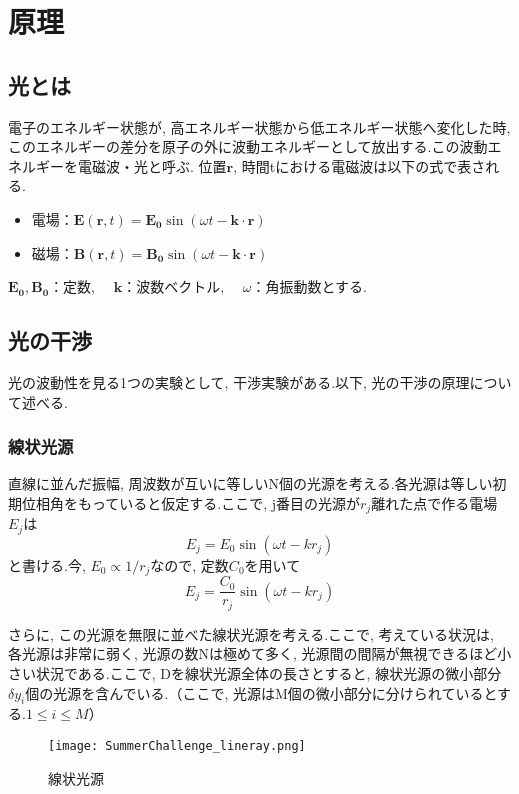 \section{原理}

\subsection{光とは}
電子のエネルギー状態が, 高エネルギー状態から低エネルギー状態へ変化した時, このエネルギーの差分を原子の外に波動エネルギーとして放出する.この波動エネルギーを電磁波・光と呼ぶ.
位置$\bm{r}$, 時間tにおける電磁波は以下の式で表される.
\begin{itemize}
  \item 電場：$\bm{E} (\bm{r}, t) = \bm{E_0} \sin (\omega t - \bm{k} \cdot \bm{r} ) $
  \item 磁場：$\bm{B} (\bm{r}, t) = \bm{B_0} \sin (\omega t - \bm{k} \cdot \bm{r} ) $
\end{itemize}
$\bm{E_0}, \bm{B_0}$：定数, 　$\bm{k}$：波数ベクトル, 　$\omega$：角振動数とする.

\subsection{光の干渉}
光の波動性を見る1つの実験として, 干渉実験がある.以下, 光の干渉の原理について述べる.
\subsubsection{線状光源}
直線に並んだ振幅, 周波数が互いに等しいN個の光源を考える.各光源は等しい初期位相角をもっていると仮定する.ここで, j番目の光源が$r_j$離れた点で作る電場$E_j$は
\[
  E_j = E_0 \sin(\omega t - k r_j)
\]
と書ける.今, $E_0 \varpropto 1/{r_j}$なので, 定数$C_0$を用いて
\[
  E_j = \frac{C_0}{r_j} \sin(\omega t - k r_j)
\]



さらに, この光源を無限に並べた線状光源を考える.ここで, 考えている状況は, 各光源は非常に弱く, 光源の数Nは極めて多く, 光源間の間隔が無視できるほど小さい状況である.ここで, Dを線状光源全体の長さとすると, 線状光源の微小部分$\delta y_i$個の光源を含んでいる.（ここで, 光源はM個の微小部分に分けられているとする.$1 \leq i \leq M$）
\\
\begin{figure}[b]
  \begin{center}
    \texttt{[image: SummerChallenge\_lineray.png]}
    \caption{線状光源}
  \end{center}
\end{figure}

